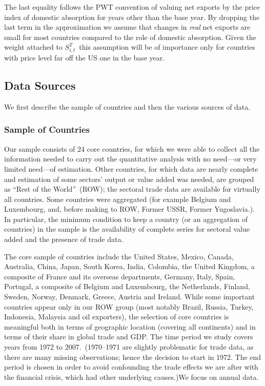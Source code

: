 \documentclass[12pt]{article}
\begin{document}
The last equality follows the PWT convention of valuing net exports by the
price index of domestic absorption for years other than the base year. By
dropping the last term in the approximation we assume that changes in 
\textit{real} net exports are small for most countries compared to the role
of domestic absorption. Given the weight attached to $S_{i,t}^{T}\,$ this
assumption will be of importance only for countries with price level far off
the US one in the base year.

\subsection{Data Sources}

We first describe the sample of countries and then the various sources of
data.

\subsubsection{Sample of Countries\protect\bigskip}

Our sample consists of 24 core countries, for which we were able to collect
all the information needed to carry out the quantitative analysis with no
need---or very limited need---of estimation. Other countries, for which data
are nearly complete and estimation of some sectors' output or value added
was needed, are grouped as \textquotedblleft Rest of the
World\textquotedblright\ (ROW); the sectoral trade data are available for
virtually all countries. Some countries were aggregated (for example Belgium
and Luxembourg, and, before making to ROW, Former USSR, Former Yugoslavia.).
In particular, the minimum condition to keep a country (or an aggregation of
countries) in the sample is the availability of complete series for sectoral
value added and the presence of trade data.

The core sample of countries include the United States, Mexico, Canada,
Australia, China, Japan, South Korea, India, Colombia, the United Kingdom, a
composite of France and its overseas departments, Germany, Italy, Spain,
Portugal, a composite of Belgium and Luxembourg, the Netherlands, Finland,
Sweden, Norway, Denmark, Greece, Austria and Ireland. While some important
countries appear only in our ROW group (most notably Brazil, Russia, Turkey,
Indonesia, Malaysia and oil exporters), the selection of core countries is
meaningful both in terms of geographic location (covering all continents)
and in terms of their share in global trade and GDP. The time period we
study covers years from 1972 to 2007.\ (1970--1971 are slightly problematic
for trade data, as there are many missing observations; hence the decision
to start in 1972. The end period is chosen in order to avoid confounding the
trade effects we are after with the financial crisis, which had other
underlying causes.)We focus on annual data.
\end{document}
